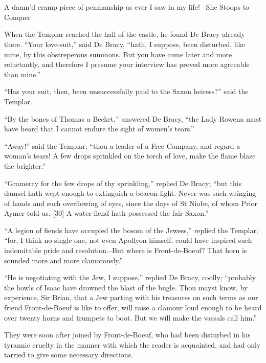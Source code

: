 \chapter{}

A damn'd cramp piece of penmanship as ever I saw in my life! --She
Stoops to Conquer

When the Templar reached the hall of the castle, he found De Bracy
already there. ``Your love-suit,'' said De Bracy, ``hath, I suppose,
been disturbed, like mine, by this obstreperous summons. But you have
come later and more reluctantly, and therefore I presume your interview
has proved more agreeable than mine.''

``Has your suit, then, been unsuccessfully paid to the Saxon heiress?''
said the Templar.

``By the bones of Thomas a Becket,'' answered De Bracy, ``the Lady
Rowena must have heard that I cannot endure the sight of women's
tears.''

``Away!'' said the Templar; ``thou a leader of a Free Company, and
regard a woman's tears! A few drops sprinkled on the torch of love, make
the flame blaze the brighter.''

``Gramercy for the few drops of thy sprinkling,'' replied De Bracy;
``but this damsel hath wept enough to extinguish a beacon-light. Never
was such wringing of hands and such overflowing of eyes, since the days
of St Niobe, of whom Prior Aymer told us. {[}30{]} A water-fiend hath
possessed the fair Saxon.''

``A legion of fiends have occupied the bosom of the Jewess,'' replied
the Templar; ``for, I think no single one, not even Apollyon himself,
could have inspired such indomitable pride and resolution.--But where is
Front-de-Boeuf? That horn is sounded more and more clamorously.''

``He is negotiating with the Jew, I suppose,'' replied De Bracy, coolly;
``probably the howls of Isaac have drowned the blast of the bugle. Thou
mayst know, by experience, Sir Brian, that a Jew parting with his
treasures on such terms as our friend Front-de-Boeuf is like to offer,
will raise a clamour loud enough to be heard over twenty horns and
trumpets to boot. But we will make the vassals call him.''

They were soon after joined by Front-de-Boeuf, who had been disturbed in
his tyrannic cruelty in the manner with which the reader is acquainted,
and had only tarried to give some necessary directions.

